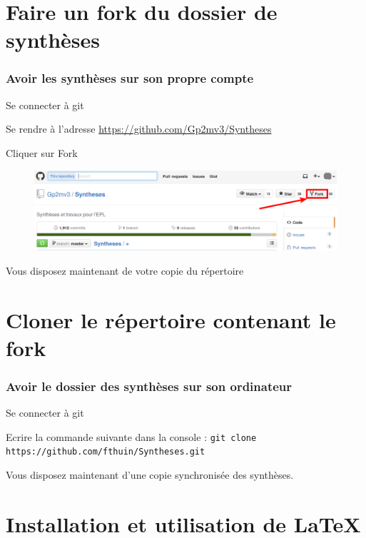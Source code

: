 \documentclass{beamer}
\newenvironment{wideitemize}{\itemize\addtolength{\itemsep}{10pt}}{\enditemize}
\begin{document}
\section{Faire un fork du dossier de synthèses}

\begin{frame}
	\frametitle{Avoir les synthèses sur son propre compte}
		\begin{wideitemize}
			\item Se connecter à git
			\pause
			\item Se rendre à l'adresse
                \url{https://github.com/Gp2mv3/Syntheses}
			\pause
			\item Cliquer sur Fork
                \begin{figure}[H]
                    \centering
                    \includegraphics[width=\linewidth]{fork.png}
                \end{figure}
			\pause
			\item Vous disposez maintenant de votre copie du répertoire
		\end{wideitemize}
\end{frame}

\section{Cloner le répertoire contenant le fork}

\begin{frame}[fragile]
    \frametitle{Avoir le dossier des synthèses sur son ordinateur}
    \begin{wideitemize}
        \item Se connecter à git
        \pause
        \item Ecrire la commande suivante dans la console :
            \verb#git clone https://github.com/fthuin/Syntheses.git#
        \pause
        \item Vous disposez maintenant d'une copie synchronisée des
            synthèses.
    \end{wideitemize}
\end{frame}

\section{Installation et utilisation de \LaTeX}
\end{document}
